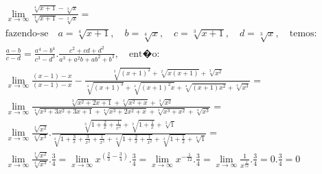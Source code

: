 \begin{ex}
\begin{align}	
&\lim_{x\rightarrow \infty} \frac{\sqrt[4]{x+1}-\sqrt[4]{x}}{\sqrt[3]{x+1}-\sqrt[3]{x}}=\nonumber\\
&\text{fazendo-se} \quad a=\sqrt[4]{x+1},\quad b=\sqrt[4]{x},\quad c=\sqrt[3]{x+1},\quad d=\sqrt[3]{x},\quad \text{temos:}\nonumber\\
&\frac{a-b}{c-d}=\frac{a^4-b^4}{c^3-d^3}.\frac{c^2+cd+d^2}{a^3+a^2b+ab^2+b^3},\quad\text{ent�o}:\nonumber\\
&\lim_{x\rightarrow \infty} \frac{(x-1)-x}{(x-1)-x}-\frac{\sqrt[3]{(x+1)^2}+\sqrt[2]{x(x+1)}+\sqrt[3]{x^2}}{\sqrt[4]{(x+1)^3}+\sqrt[4]{(x+1)^2x}+\sqrt[4]{(x+1)x^2}+\sqrt[4]{x^3}}=\nonumber\\
&\lim_{x\rightarrow \infty} \frac{\sqrt[3]{x^2+2x+1}+\sqrt[3]{x^2+x}+\sqrt[3]{x^2}}{\sqrt[4]{x^3+3x^2+3x+1}+\sqrt[4]{x^3+2x^2+x}+\sqrt[4]{x^3+x^2}+\sqrt[4]{x^3}}=\nonumber\\
&\lim_{x\rightarrow \infty} \frac{\sqrt[3]{x^2}}{\sqrt[4]{x^3}}.\frac{\sqrt[3]{1+\frac{2}{x}+\frac{1}{x^2}}+\sqrt[3]{1+\frac{1}{x}}+\sqrt[3]{1}}{\sqrt[4]{1+\frac{3}{x}+\frac{3}{x^2}+\frac{1}{x^3}}+\sqrt[4]{1+\frac{2}{x}+\frac{1}{x^2}}+\sqrt[4]{1+\frac{1}{2}}+\sqrt[4]{1}}=\nonumber\\
&\lim_{x\rightarrow \infty} \frac{\sqrt[3]{x^2}}{\sqrt[4]{x^3}}.\frac{3}{4}=\lim_{x\rightarrow \infty} x^{(\frac{2}{3}-\frac{3}{4})}.\frac{3}{4}=\lim_{x\rightarrow \infty} x^{-\frac{1}{12}}.\frac{3}{4}=\lim_{x\rightarrow \infty}\frac{1}{x^\frac{1}{12}}.\frac{3}{4}=0.\frac{3}{4}=0 \nonumber
\end{align}
\end{ex}
